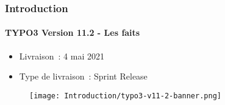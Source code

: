 %

\begin{frame}[fragile]
	\frametitle{Introduction}
	\framesubtitle{TYPO3 Version 11.2 - Les faits}

	\begin{itemize}
		\item Livraison~: 4 mai 2021
		\item Type de livraison~: Sprint Release
	\end{itemize}

	\begin{figure}
		\texttt{[image: Introduction/typo3-v11-2-banner.png]}
	\end{figure}

\end{frame}

